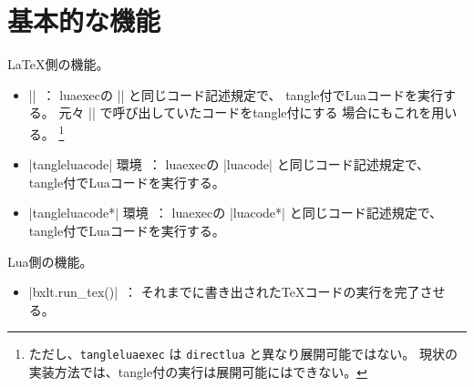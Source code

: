 \documentclass[a4paper]{ltjsarticle}
\newcommand{\Pkg}[1]{\textsf{#1}}
\newcommand{\Meta}[1]{$\langle$\mbox{}#1\mbox{}$\rangle$}
\newcommand{\Means}{~：\quad}
\begin{document}
\section{基本的な機能}
\label{sec:basic}
\newcommand*\Cs[1]{\texttt{\symbol{`\\}#1}}

{\LaTeX}側の機能。

\begin{itemize}
\item |\tangleluaexec{|\Meta{Luaコード}|}|\Means
  \Pkg{luaexec}の |\luaexec| と同じコード記述規定で、
  tangle付でLuaコードを実行する。
  元々 |\directlua| で呼び出していたコードをtangle付にする
  場合にもこれを用いる。
  \footnote{ただし、\Cs{tangleluaexec} は \Cs{directlua}
    と異なり展開可能ではない。
    現状の実装方法では、tangle付の実行は展開可能にはできない。}
\item |tangleluacode| 環境\Means
  \Pkg{luaexec}の |luacode| と同じコード記述規定で、
  tangle付でLuaコードを実行する。
\item |tangleluacode*| 環境\Means
  \Pkg{luaexec}の |luacode*| と同じコード記述規定で、
  tangle付でLuaコードを実行する。
\end{itemize}

Lua側の機能。

\begin{itemize}
\item |bxlt.run_tex()|\Means
  それまでに書き出された{\TeX}コードの実行を完了させる。
\end{itemize}
\end{document}
